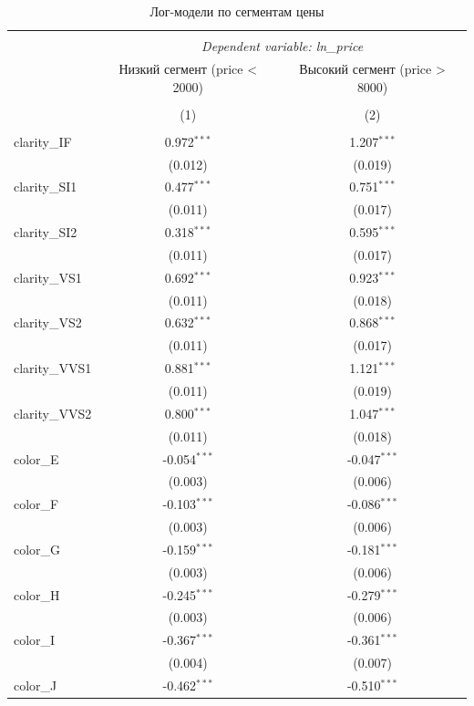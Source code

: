 \begin{table}[!htbp] \centering
  \caption{Лог-модели по сегментам цены}
\begin{tabular}{@{\extracolsep{5pt}}lcc}
\\[-1.8ex]\hline
\hline \\[-1.8ex]
& \multicolumn{2}{c}{\textit{Dependent variable: ln_price}} \
\cr \cline{2-3}
\\[-1.8ex] & \multicolumn{1}{c}{Низкий сегмент (price < 2000)} & \multicolumn{1}{c}{Высокий сегмент (price > 8000)}  \\
\\[-1.8ex] & (1) & (2) \\
\hline \\[-1.8ex]
 clarity_IF & 0.972$^{***}$ & 1.207$^{***}$ \\
& (0.012) & (0.019) \\
 clarity_SI1 & 0.477$^{***}$ & 0.751$^{***}$ \\
& (0.011) & (0.017) \\
 clarity_SI2 & 0.318$^{***}$ & 0.595$^{***}$ \\
& (0.011) & (0.017) \\
 clarity_VS1 & 0.692$^{***}$ & 0.923$^{***}$ \\
& (0.011) & (0.018) \\
 clarity_VS2 & 0.632$^{***}$ & 0.868$^{***}$ \\
& (0.011) & (0.017) \\
 clarity_VVS1 & 0.881$^{***}$ & 1.121$^{***}$ \\
& (0.011) & (0.019) \\
 clarity_VVS2 & 0.800$^{***}$ & 1.047$^{***}$ \\
& (0.011) & (0.018) \\
 color_E & -0.054$^{***}$ & -0.047$^{***}$ \\
& (0.003) & (0.006) \\
 color_F & -0.103$^{***}$ & -0.086$^{***}$ \\
& (0.003) & (0.006) \\
 color_G & -0.159$^{***}$ & -0.181$^{***}$ \\
& (0.003) & (0.006) \\
 color_H & -0.245$^{***}$ & -0.279$^{***}$ \\
& (0.003) & (0.006) \\
 color_I & -0.367$^{***}$ & -0.361$^{***}$ \\
& (0.004) & (0.007) \\
 color_J & -0.462$^{***}$ & -0.510$^{***}$ \\

\end{tabular}
\end{table}
